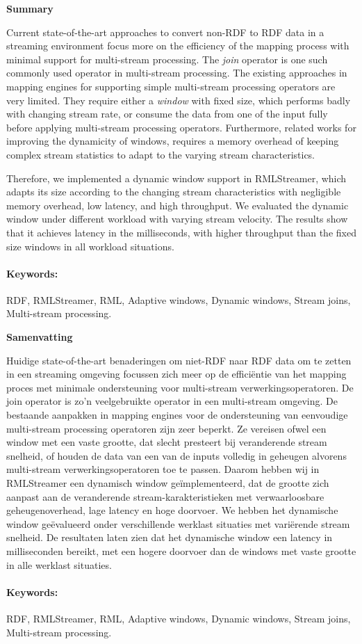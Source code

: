 \newpage
{}
{}
\noindent \textbf{\huge Summary}

\vspace{1.5cm}
Current state-of-the-art approaches to convert non-RDF to RDF data in 
a streaming environment focus more on the efficiency of the 
mapping process with minimal support for multi-stream processing. 
The \emph{join} operator is one such commonly used operator in multi-stream processing. 
The existing approaches in mapping engines for supporting simple multi-stream processing operators
are very limited.
They require either a \emph{window} with fixed size, which performs badly with 
changing stream rate, or consume the data from 
one of the input fully before applying multi-stream processing operators.
Furthermore, related works for improving the dynamicity of windows, 
requires a memory overhead of keeping complex stream statistics to adapt 
to the varying stream characteristics.

Therefore, we implemented a dynamic window support in RMLStreamer, which 
adapts its size according to the changing stream characteristics with
negligible memory overhead, low latency, and high throughput. We evaluated the dynamic window
under different workload with varying stream velocity. The results 
show that it achieves latency in the milliseconds, with higher 
throughput than the fixed size windows in all workload situations. 

\paragraph{Keywords:}

RDF, RMLStreamer, RML, Adaptive windows, Dynamic windows,
Stream joins, Multi-stream processing.


\newpage
\noindent \textbf{\huge Samenvatting}

\vspace{1.5cm}
Huidige state-of-the-art benaderingen om niet-RDF naar RDF data om te zetten
in een streaming omgeving focussen zich meer op de efficiëntie van het 
mapping proces met minimale ondersteuning voor multi-stream verwerkingsoperatoren.
De join operator is zo'n veelgebruikte operator in een multi-stream omgeving.
De bestaande aanpakken in mapping engines voor de ondersteuning van 
eenvoudige multi-stream processing operatoren zijn zeer beperkt.
Ze vereisen ofwel een window met een vaste grootte, dat slecht presteert bij 
veranderende stream snelheid, of houden de data van een van de inputs 
volledig in geheugen alvorens multi-stream verwerkingsoperatoren toe te passen.
Daarom hebben wij in RMLStreamer een dynamisch window geïmplementeerd, 
dat de grootte zich aanpast aan de veranderende stream-karakteristieken met 
verwaarloosbare geheugenoverhead, lage latency en hoge doorvoer.
We hebben het dynamische window geëvalueerd onder verschillende werklast situaties 
met variërende stream snelheid.
De resultaten laten zien dat het dynamische window een latency in milliseconden bereikt, 
met een hogere doorvoer dan de windows met vaste grootte in alle werklast situaties.

\paragraph{Keywords:}

RDF, RMLStreamer, RML, Adaptive windows, Dynamic windows,
Stream joins, Multi-stream processing.

